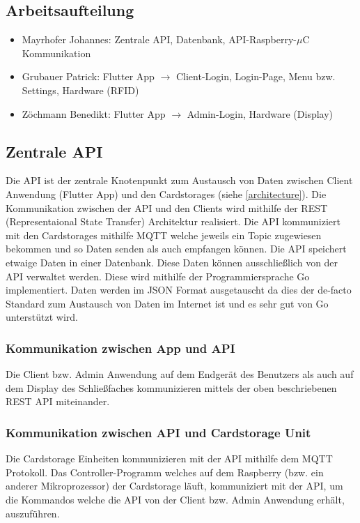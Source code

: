 \documentclass[a4paper]{article}
\begin{document}
\pagebreak

\subsection{Arbeitsaufteilung}
\begin{itemize}
    \item Mayrhofer Johannes: Zentrale API, Datenbank, API-Raspberry-$\mu$C Kommunikation
    \item Grubauer Patrick: Flutter App $\rightarrow$ Client-Login, Login-Page, Menu bzw. Settings, Hardware (RFID)
    \item Zöchmann Benedikt: Flutter App $\rightarrow$ Admin-Login, Hardware (Display)
\end{itemize}

\newpage

\subsection{Zentrale API}
Die API ist der zentrale Knotenpunkt zum Austausch von Daten zwischen Client Anwendung (Flutter App) und den Cardstorages (siehe \autoref{architecture}). Die Kommunikation zwischen der API und den Clients wird mithilfe der REST (Representaional State Transfer) Architektur realisiert. Die API kommuniziert mit den Cardstorages mithilfe MQTT welche jeweils ein Topic zugewiesen bekommen und so Daten senden als auch empfangen können. Die API speichert etwaige Daten in einer Datenbank. Diese Daten können ausschließlich von der API verwaltet werden. Diese wird mithilfe der Programmiersprache Go implementiert. Daten werden im JSON Format ausgetauscht da dies der de-facto Standard zum Austausch von Daten im Internet ist und es sehr gut von Go unterstützt wird.   

\subsubsection{Kommunikation zwischen App und API}
Die Client bzw. Admin Anwendung auf dem Endgerät des Benutzers als auch auf dem Display des Schließfaches kommunizieren mittels der oben beschriebenen REST API miteinander. 

\subsubsection{Kommunikation zwischen API und Cardstorage Unit}
Die Cardstorage Einheiten kommunizieren mit der API mithilfe dem MQTT Protokoll. Das Controller-Programm welches auf dem Raspberry (bzw. ein anderer Mikroprozessor) der Cardstorage läuft, kommuniziert mit der API, um die Kommandos welche die API von der Client bzw. Admin Anwendung erhält, auszuführen.
\end{document}
